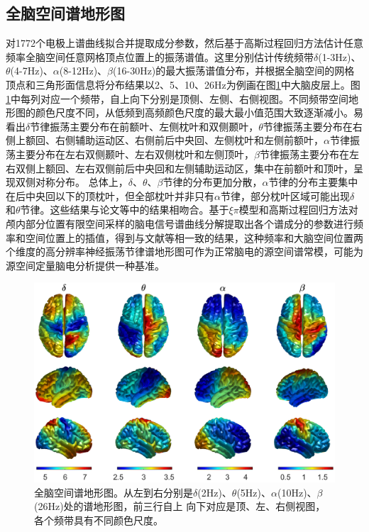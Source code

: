 \subsection{全脑空间谱地形图}
对1772个电极上谱曲线拟合并提取成分参数，然后基于高斯过程回归方法估计任意频率全脑空间任意网格顶点位置上的振荡谱值。这里分别估计传统频带$\delta$(1-3Hz)、$\theta$(4-7Hz)、$\alpha$(8-12Hz)、$\beta$(16-30Hz)的最大振荡谱值分布，并根据全脑空间的网格顶点和三角形面信息将分布结果以2、5、10、26Hz为例画在图\ref{7:map}中大脑皮层上。图\ref{7:map}中每列对应一个频带，自上向下分别是顶侧、左侧、右侧视图。不同频带空间地形图的颜色尺度不同，从低频到高频颜色尺度的最大最小值范围大致逐渐减小。易看出$\delta$节律振荡主要分布在前额叶、左侧枕叶和双侧颞叶，$\theta$节律振荡主要分布在右侧上额回、右侧辅助运动区、右侧前后中央回、左侧枕叶和左侧前额叶，$\alpha$节律振荡主要分布在左右双侧颞叶、左右双侧枕叶和左侧顶叶，$\beta$节律振荡主要分布在左右双侧上额回、左右双侧前后中央回和左侧辅助运动区，集中在前额叶和顶叶，呈现双侧对称分布。 总体上，$\delta$、$\theta$、$\beta$节律的分布更加分散，$\alpha$节律的分布主要集中在后中央回以下的顶枕叶，但全部枕叶并非只有$\alpha$节律，部分枕叶区域可能出现$\delta$和$\theta$节律。这些结果与论文等中的结果相吻合。基于$\xi\pi$模型和高斯过程回归方法对颅内部分位置有限空间采样的脑电信号谱曲线分解提取出各个谱成分的参数进行频率和空间位置上的插值，得到与文献等相一致的结果，这种频率和大脑空间位置两个维度的高分辨率神经振荡节律谱地形图可作为正常脑电的源空间谱常模，可能为源空间定量脑电分析提供一种基准。
\begin{figure}[!h]
	\includegraphics[width=15cm]{pic/xipi/map.png}
	\caption{全脑空间谱地形图。从左到右分别是$\delta$(2Hz)、$\theta$(5Hz)、$\alpha$(10Hz)、$\beta$(26Hz)处的谱地形图，前三行自上
	向下对应是顶、左、右侧视图，各个频带具有不同颜色尺度。}
	\label{7:map}
\end{figure}

